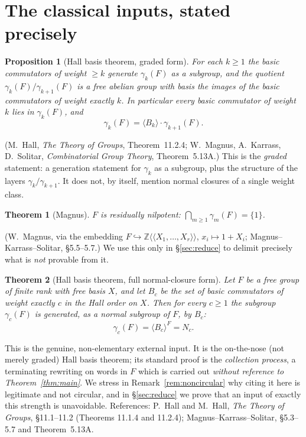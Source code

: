 \documentclass{amsart}
\newtheorem{theorem}{Theorem}
\newtheorem{proposition}{Proposition}
\theoremstyle{definition}
\theoremstyle{remark}
\begin{document}
\section{The classical inputs, stated precisely}\label{sec:input}

\begin{proposition}[Hall basis theorem, graded form]\label{prop:hall}
For each $k\ge 1$ the basic commutators of weight $\ge k$ generate $\gamma_k(F)$
\emph{as a subgroup}, and the quotient $\gamma_k(F)/\gamma_{k+1}(F)$ is a free
abelian group with basis the images of the basic commutators of weight exactly
$k$. In particular every basic commutator of weight $k$ lies in $\gamma_k(F)$, and
\begin{equation}\label{eq:hall-decomp}
\gamma_k(F)=\langle B_k\rangle\cdot\gamma_{k+1}(F).
\end{equation}
\end{proposition}

\noindent
(M.\ Hall, \emph{The Theory of Groups}, Theorem~11.2.4; W.\ Magnus, A.\ Karrass,
D.\ Solitar, \emph{Combinatorial Group Theory}, Theorem~5.13A.) This is the
\emph{graded} statement: a generation statement for $\gamma_k$ as a subgroup, plus
the structure of the layers $\gamma_k/\gamma_{k+1}$. It does not, by itself,
mention normal closures of a single weight class.

\begin{theorem}[Magnus]\label{thm:magnus}
$F$ is residually nilpotent: $\bigcap_{m\ge1}\gamma_m(F)=\{1\}$.
\end{theorem}

\noindent
(W.\ Magnus, via the embedding $F\hookrightarrow\mathbb Z\langle\!\langle
X_1,\dots,X_r\rangle\!\rangle$, $x_i\mapsto 1+X_i$; Magnus--Karrass--Solitar,
\S5.5--5.7.) We use this only in \S\ref{sec:reduce} to delimit precisely what is
\emph{not} provable from it.

\begin{theorem}[Hall basis theorem, full normal-closure form]\label{thm:hall-full}
Let $F$ be a free group of finite rank with free basis $X$, and let $B_c$ be the
set of basic commutators of weight exactly $c$ in the Hall order on $X$. Then for
every $c\ge1$ the subgroup $\gamma_c(F)$ is generated, as a \emph{normal} subgroup
of $F$, by $B_c$:
\[
\gamma_c(F)=\langle B_c\rangle^{F}=N_c .
\]
\end{theorem}

\noindent
This is the genuine, non-elementary external input. It is the on-the-nose (not
merely graded) Hall basis theorem; its standard proof is the \emph{collection
process}, a terminating rewriting on words in $F$ which is carried out
\emph{without reference to Theorem~\ref{thm:main}}. We stress in
Remark~\ref{rem:noncircular} why citing it here is legitimate and not circular,
and in \S\ref{sec:reduce} we prove that an input of exactly this strength is
unavoidable. References: P.\ Hall and M.\ Hall, \emph{The Theory of Groups},
\S11.1--11.2 (Theorems 11.1.4 and 11.2.4); Magnus--Karrass--Solitar, \S5.3--5.7
and Theorem~5.13A.
\end{document}

